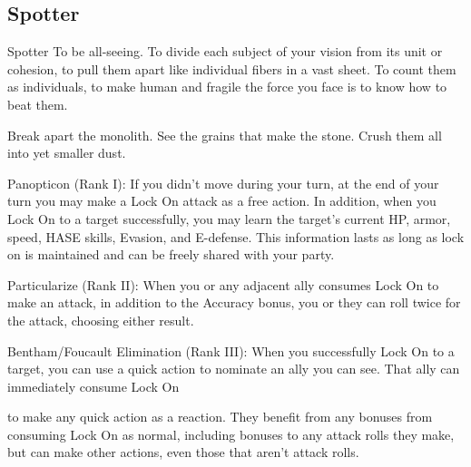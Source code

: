 \subsection{Spotter}

                                                      Spotter
To be all-seeing. To divide each subject of your vision from its unit or cohesion, to pull them apart
like individual fibers in a vast sheet. To count them as individuals, to make human and fragile the
force you face is to know how to beat them.

Break apart the monolith. See the grains that make the stone. Crush them all into yet smaller
dust.


Panopticon (Rank I): If you didn’t move during your turn, at the end of your turn you may make
a Lock On attack as a free action. In addition, when you Lock On to a target successfully, you
may learn the target’s current HP, armor, speed, HASE skills, Evasion, and E-defense. This
information lasts as long as lock on is maintained and can be freely shared with your party.

Particularize (Rank II): When you or any adjacent ally consumes Lock On to make an attack, in
addition to the Accuracy bonus, you or they can roll twice for the attack, choosing either result.

Bentham/Foucault Elimination (Rank III): When you successfully Lock On to a target, you can
use a quick action to nominate an ally you can see. That ally can immediately consume Lock On




to make any quick action as a reaction. They benefit from any bonuses from consuming Lock On
as normal, including bonuses to any attack rolls they make, but can make other actions, even
those that aren’t attack rolls.